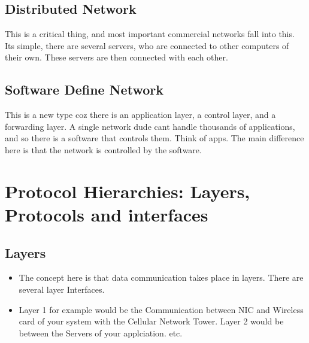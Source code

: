 \documentclass[11pt]{article}
\begin{document}
\subsection{Distributed Network}
This is a critical thing, and most important commercial networks fall into this. Its simple, there are several servers, who are connected to other computers of their own. These servers are then connected with each other. 
\subsection{Software Define Network}
This is a new type coz there is an application layer, a control layer, and a forwarding layer. A single network dude cant handle thousands of applications, and so there is a software that controls them. Think of apps. The main difference here is that the network is controlled by the software. 


\section{Protocol Hierarchies: Layers, Protocols and interfaces}
\subsection{Layers}
\begin{itemize}
	\item The concept here is that data communication takes place in layers. There are several layer Interfaces. 
	\item Layer 1 for example would be the Communication between NIC and Wireless card of your system with the Cellular Network Tower. Layer 2 would be between the Servers of your applciation. etc. 
\end{itemize}
\end{document}
